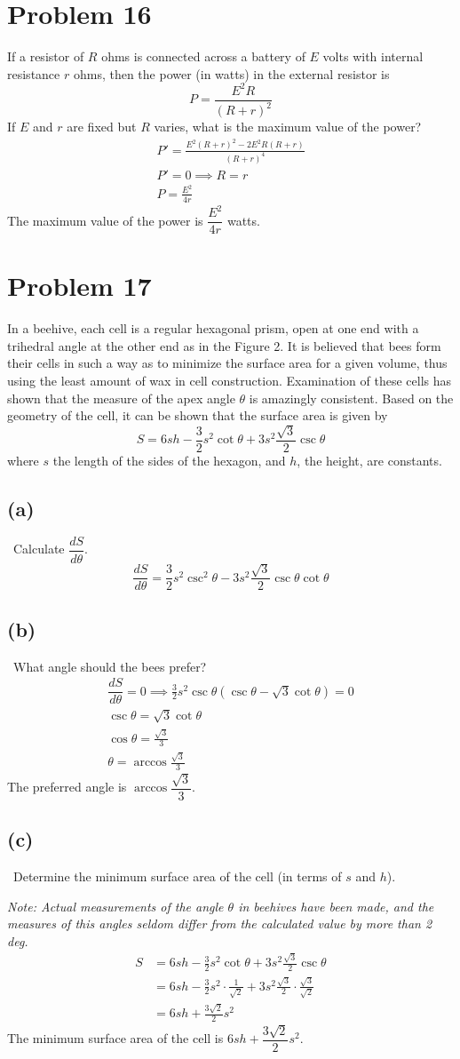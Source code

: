 \documentclass[12pt]{article}
\newcommand{\vem}{\vspace{0.5em}}
\newcommand{\problem}[1]{\section{Problem #1}}
\newcommand{\subproblem}[1]{\subsection{(#1)} \,}
\begin{document}
\problem{16}
If a resistor of $R$ ohms is connected across a battery of $E$ volts with internal resistance $r$ ohms, then the
power (in watts) in the external resistor is
\[
P=\frac{E^2R}{(R+r)^2}
\]
If $E$ and $r$ are fixed but $R$ varies, what is the maximum value of the power?
\begin{gather*}
    P'=\frac{E^2(R+r)^2-2E^2R(R+r)}{(R+r)^4}\\
    P'=0 \implies R=r\\
    \boxed{P=\frac{E^2}{4r}}
\end{gather*}
The maximum value of the power is $\dfrac{E^2}{4r}$ watts.

\problem{17}
In a beehive, each cell is a regular hexagonal prism, open at one end with a trihedral angle at the other end as in the Figure 2. It is believed that bees form their cells in such a way as to minimize the surface area for a given volume, thus using the least amount of wax in cell construction. Examination of these cells has shown that the measure of the apex angle $\theta$ is amazingly consistent. Based on the geometry of the cell, it can be shown that the surface area is given by
\[
S = 6sh - \frac{3}{2}s^2 \cot \theta + 3s^2 \frac{\sqrt{3}}{2} \csc \theta
\]
where $s$ the length of the sides of the hexagon, and $h$, the height, are constants. \vem

\subproblem{a} Calculate $\dfrac{dS}{d\theta}$.
\[
\boxed{\dfrac{dS}{d\theta}=\frac{3}{2}s^2 \csc^2\theta - 3s^2 \frac{\sqrt{3}}{2} \csc \theta \cot \theta }
\]

\subproblem{b} What angle should the bees prefer?
\begin{gather*}
    \dfrac{dS}{d\theta}=0 \implies \frac{3}{2}s^2\csc \theta (\csc \theta -\sqrt{3}\cot \theta )=0\\
    \csc \theta =\sqrt{3}  \cot \theta \\
    \cos \theta =\frac{\sqrt{3}}{3}\\
    \boxed{\theta =\arccos \frac{\sqrt{3}}{3}}
\end{gather*}
The preferred angle is $\arccos \dfrac{\sqrt{3}}{3}$.

\subproblem{c} Determine the minimum surface area of the cell (in terms of $s$ and $h$).\vem

\textit{Note: Actual measurements of the angle $\theta$ in beehives have been made, and the measures of this angles seldom differ from the calculated value by more than 2 deg.}
\begin{align*}
    S &= 6sh - \frac{3}{2}s^2 \cot \theta + 3s^2 \frac{\sqrt{3}}{2} \csc \theta\\
    &= 6sh-\frac{3}{2}s^2\cdot \frac{1}{\sqrt{2}}+3s^2\frac{\sqrt{3}}{2}\cdot \frac{\sqrt{3}}{\sqrt{2}}\\
    &=\boxed{6sh+\frac{3\sqrt{2}}{2}s^2}
\end{align*}
The minimum surface area of the cell is $6sh+\dfrac{3\sqrt{2}}{2}s^2$.
\end{document}

